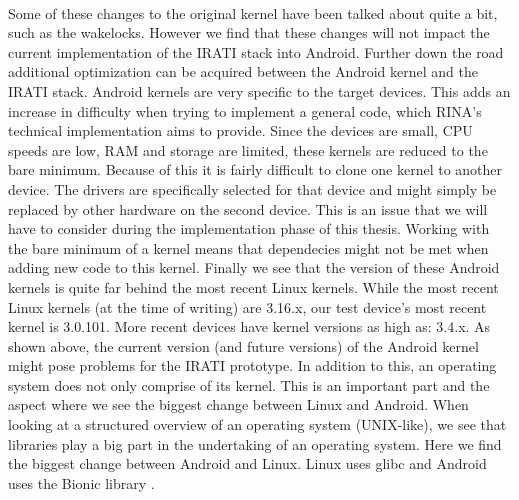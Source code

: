 \\
Some of these changes to the original kernel have been talked about quite a bit, such as the wakelocks. However we find that these changes will not impact the current implementation of the IRATI stack into Android. Further down the road additional optimization can be acquired between the Android kernel and the IRATI stack. 
\npar
Android kernels are very specific to the target devices. This adds an increase in difficulty when trying to implement a general code, which RINA's technical implementation aims to provide. Since the devices are small, CPU speeds are low, RAM and storage are limited, these kernels are reduced to the bare minimum. Because of this it is fairly difficult to clone one kernel to another device. The drivers are specifically selected for that device and might simply be replaced by other hardware on the second device. This is an issue that we will have to consider during the implementation phase of this thesis. Working with the bare minimum of a kernel means that dependecies might not be met when adding new code to this kernel. Finally we see that the version of these Android kernels is quite far behind the most recent Linux kernels. While the most recent Linux kernels (at the time of writing) are 3.16.x, our test device's most recent kernel is 3.0.101. More recent devices have kernel versions as high as: 3.4.x.
\npar
As shown above, the current version (and future versions) of the Android kernel might pose problems for the IRATI prototype. In addition to this, an operating system does not only comprise of its kernel. This is an important part and the aspect where we see the biggest change between Linux and Android. When looking at a structured overview of an operating system (UNIX-like), we see that libraries play a big part in the undertaking of an operating system. Here we find the biggest change between Android and Linux. Linux uses glibc \citep{website:glibc} and Android uses the Bionic library \citep{github:bionic,website:c_lib_bionic}. 
\npar
